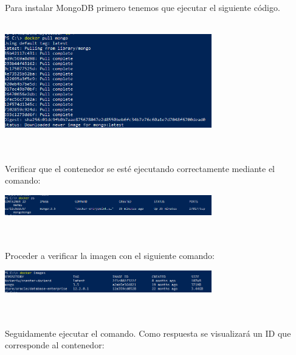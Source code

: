 \documentclass[twoside,onecolumn]{article}
\begin{document}
\begin{flushright}
\begin{itemize}
\textbf{}\\
\textbf{}\\
\textbf{}\\
\textbf{}\\
\textbf{}\\

Para instalar MongoDB primero tenemos que ejecutar el siguiente código.
\textbf{}\\
\textbf{}\\
\begin{center}
		\includegraphics[width=9cm]{./Imagenes/2d}
		\end{center}	
\textbf{}\\
\textbf{}\\
Verificar que el contenedor se esté ejecutando correctamente mediante el comando:

\begin{center}
		\includegraphics[width=9cm]{./Imagenes/3d}
		\end{center}	
\textbf{}\\
\textbf{}\\
Proceder a verificar la imagen con el siguiente comando:

\begin{center}
		\includegraphics[width=9cm]{./Imagenes/4d}
		\end{center}	
\textbf{}\\
\textbf{}\\
Seguidamente ejecutar el comando. Como respuesta
se visualizará un ID que corresponde al contenedor:


\end{itemize}
\end{flushright}
\end{document}
